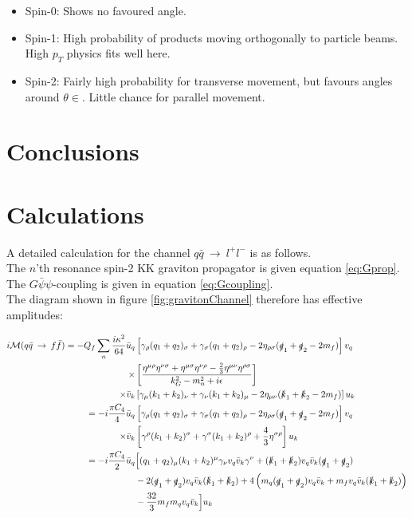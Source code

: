 \documentclass[11pt,a4paper]{article}
\begin{document}
\begin{itemize}
	\item Spin-0: Shows no favoured angle.
	\item Spin-1: High probability of products moving orthogonally to particle beams. High $p_T$ physics fits well here.
	\item Spin-2: Fairly high probability for transverse movement, but favours angles around $\theta \in$. Little chance for parallel movement.
\end{itemize}

\section{Conclusions}


\appendix
\section{Calculations}
A detailed calculation for the channel $q\bar{q}\:\rightarrow\:l^+l^-$ is as follows.\\
The $n$'th resonance spin-2 KK graviton propagator is given equation \ref{eq:Gprop}. The $G\bar{\psi}\psi$-coupling is given in equation \ref{eq:Gcoupling}.\\
The diagram shown in figure \ref{fig:gravitonChannel} therefore has effective amplitudes:

\begin{align}
	\begin{split}
	i\mathcal{M}(q\bar{q}\:\rightarrow\:f\bar{f}) = -Q_f\sum_{n}\frac{i\kappa^2}{64}\bar{u}_q&\left[\gamma_\rho(q_1 + q_2)_\sigma + \gamma_\sigma(q_1+q_2)_\rho - 2\eta_{\rho\sigma}(\slashed q_1 + \slashed q_2 - 2m_f)\right]v_q\\
	\times&\left[\frac{\eta^{\mu\rho}\eta^{\nu\sigma} + \eta^{\mu\sigma}\eta^{\nu\rho} - \frac{2}{3}\eta^{\mu\nu}\eta^{\rho\sigma}}{k_G^2 - m_n^2 + i\epsilon}\right]\\
	\times\bar{v}_k&\left[\gamma_\mu(k_1 + k_2)_\nu + \gamma_\nu(k_1+k_2)_\mu - 2\eta_{\mu\nu}(\slashed k_1 + \slashed k_2 - 2m_f)\right]u_k\\
	= -i\frac{\pi C_4}{4}\bar{u}_q&\left[\gamma_\rho(q_1 + q_2)_ \sigma + \gamma_\sigma(q_1+q_2)_\rho - 2\eta_{\rho\sigma}(\slashed q_1 + \slashed q_2 - 2m_f)\right]v_q\\
	\times\bar{v}_k&\left[\gamma^\rho(k_1 + k_2)^\sigma + \gamma^\sigma(k_1+k_2)^\rho + \frac{4}{3}\eta^{\sigma\rho}\right]u_k\\
	= -i\frac{\pi C_4}{2}\bar{u}_q&\Big[(q_1 + q_2)_ \mu(k_1+k_2)^\mu \gamma_\nu v_q\bar{v}_k\gamma^\nu + (\slashed k_1 + \slashed k_2)v_q\bar{v}_k(\slashed q_1 + \slashed q_2)\\
	&- 2(\slashed q_1 + \slashed q_2)v_q\bar{v}_k(\slashed k_1 + \slashed k_2) + 4\left(m_q(\slashed q_1 + \slashed q_2)v_q\bar{v}_k + m_fv_q\bar{v}_k(\slashed k_1 + \slashed k_2)\right)\\
	&- \frac{32}{3}m_fm_qv_q\bar{v}_k\Big]u_k
	\end{split}
\end{align}
\end{document}

